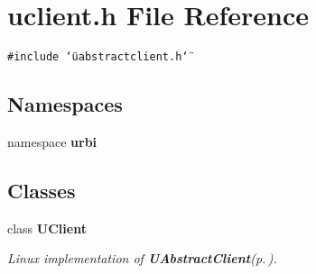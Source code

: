 \section{uclient.h File Reference}
\label{uclient_8h}
{\tt \#include \char`\"{}uabstractclient.h\char`\"{}}\par
\subsection*{Namespaces}
\begin{CompactItemize}
\item 
namespace {\bf urbi}
\end{CompactItemize}
\subsection*{Classes}
\begin{CompactItemize}
\item 
class {\bf UClient}
\begin{CompactList}\small\item\em Linux implementation of {\bf UAbstract\-Client}{\rm (p.\,\pageref{classUAbstractClient})}. \item\end{CompactList}\end{CompactItemize}
